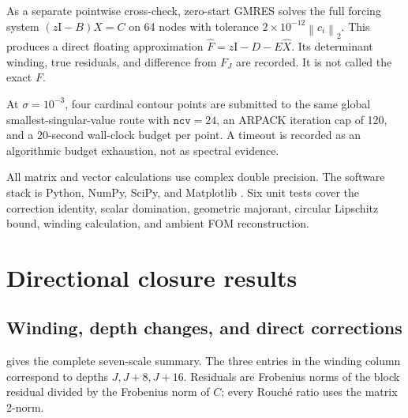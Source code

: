\documentclass[11pt]{article}
\theoremstyle{definition}
\theoremstyle{remark}
\newcommand{\Id}{\mathrm I}
\newcommand{\norm}[1]{\left\lVert#1\right\rVert}
\begin{document}
As a separate pointwise cross-check, zero-start GMRES solves the full
forcing system \((z\Id-B)X=C\) on 64 nodes with tolerance
\(2\times10^{-12}\norm{c_i}_2\).  This produces a direct floating
approximation \(\widehat F=z\Id-D-E\widehat X\).  Its determinant winding,
true residuals, and difference from \(F_J\) are recorded.  It is not called
the exact \(F\).

At \(\sigma=10^{-3}\), four cardinal contour points are submitted to the
same global smallest-singular-value route with \(\texttt{ncv}=24\), an
ARPACK iteration cap of 120, and a 20-second wall-clock budget per point.  A timeout
is recorded as an algorithmic budget exhaustion, not as spectral evidence.

All matrix and vector calculations use complex double precision.  The
software stack is Python, NumPy, SciPy, and Matplotlib
\citep{HarrisEtAl2020,VirtanenEtAl2020,Hunter2007}.  Six unit tests cover
the correction identity, scalar domination, geometric majorant, circular
Lipschitz bound, winding calculation, and ambient FOM reconstruction.

\section{Directional closure results}
\label{sec:directional-results}

\subsection{Winding, depth changes, and direct corrections}

 gives the complete seven-scale summary.  The three
entries in the winding column correspond to depths \(J,J+8,J+16\).
Residuals are Frobenius norms of the block residual divided by the
Frobenius norm of \(C\); every Rouch\'e ratio uses the matrix 2-norm.
\end{document}
